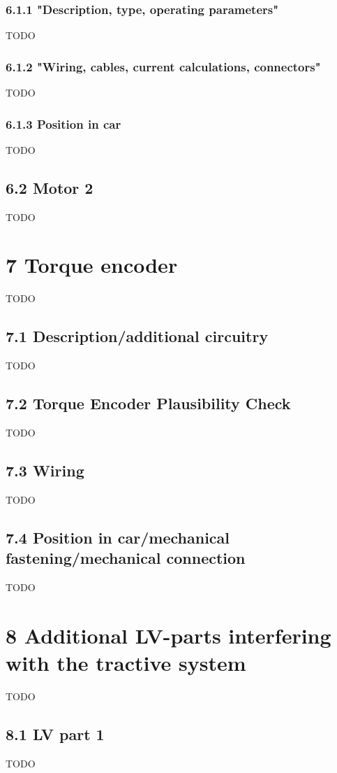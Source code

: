 \documentclass{article}
\begin{document}
\subsubsection*{6.1.1 "Description, type, operating parameters"}
TODO

\subsubsection*{6.1.2 "Wiring, cables, current calculations, connectors"}
TODO

\subsubsection*{6.1.3 Position in car}
TODO

\subsection*{6.2 Motor 2}
TODO

\section*{7 Torque encoder}
TODO

\subsection*{7.1 Description/additional circuitry}
TODO

\subsection*{7.2 Torque Encoder Plausibility Check}
TODO

\subsection*{7.3 Wiring}
TODO

\subsection*{7.4 Position in car/mechanical fastening/mechanical connection}
TODO

\section*{8 Additional LV-parts interfering with the tractive system}
TODO

\subsection*{8.1 LV part 1}
TODO
\end{document}
